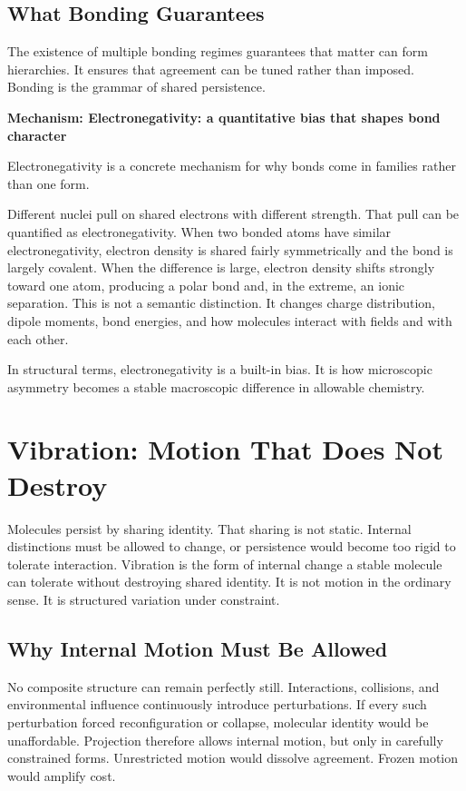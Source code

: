 \documentclass[11pt,twoside,openright]{book}
\newenvironment{mechanismbox}[1]
  {\begin{framed}\noindent\textbf{Mechanism: #1}\par\medskip}
  {\end{framed}}
\begin{document}
\section*{What Bonding Guarantees}

The existence of multiple bonding regimes guarantees that matter can form hierarchies. It ensures that agreement can be tuned rather than imposed. Bonding is the grammar of shared persistence.

\begin{mechanismbox}{Electronegativity: a quantitative bias that shapes bond character}
Electronegativity is a concrete mechanism for why bonds come in families rather than one form.

Different nuclei pull on shared electrons with different strength. That pull can be quantified as electronegativity. When two bonded atoms have similar electronegativity, electron density is shared fairly symmetrically and the bond is largely covalent. When the difference is large, electron density shifts strongly toward one atom, producing a polar bond and, in the extreme, an ionic separation. This is not a semantic distinction. It changes charge distribution, dipole moments, bond energies, and how molecules interact with fields and with each other.

In structural terms, electronegativity is a built-in bias.
It is how microscopic asymmetry becomes a stable macroscopic difference in allowable chemistry.
\end{mechanismbox}
\chapter{Vibration: Motion That Does Not Destroy}

Molecules persist by sharing identity. That sharing is not static. Internal distinctions must be allowed to change, or persistence would become too rigid to tolerate interaction. Vibration is the form of internal change a stable molecule can tolerate without destroying shared identity. It is not motion in the ordinary sense. It is structured variation under constraint.

\section*{Why Internal Motion Must Be Allowed}

No composite structure can remain perfectly still. Interactions, collisions, and environmental influence continuously introduce perturbations. If every such perturbation forced reconfiguration or collapse, molecular identity would be unaffordable. Projection therefore allows internal motion, but only in carefully constrained forms. Unrestricted motion would dissolve agreement. Frozen motion would amplify cost.
\end{document}
